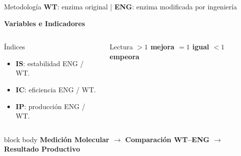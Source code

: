 \begin{frame}[label=metodologia]{Metodología \hfill{\tiny\color{TextoSuave}\textbf{WT}: enzima original \quad | \quad \textbf{ENG}: enzima modificada por ingeniería}}



{\color{Cian}\bfseries Variables e Indicadores}\par
\vspace{0.08cm}

\begin{columns}[T,onlytextwidth]
\end{columns}

\vspace{0.11cm}
\begin{columns}[T,onlytextwidth]
\begin{block}{Índices}
\small
\begin{itemize}
\item \textbf{IS}: estabilidad ENG / WT.
\item \textbf{IC}: eficiencia ENG / WT.
\item \textbf{IP}: producción ENG / WT.
\end{itemize}
\end{block}
\begin{alertblock}{Lectura}
\centering\small\bfseries
$>1$ mejora \qquad $=1$ igual \qquad $<1$ empeora
\end{alertblock}
\end{columns}

\vspace{0.06cm}
\begin{beamercolorbox}[wd=\linewidth,sep=0.08cm,rounded=true,center]{block body}
\small\bfseries\color{CianClaro}
Medición Molecular $\longrightarrow$ Comparación WT--ENG $\longrightarrow$ Resultado Productivo
\end{beamercolorbox}

\vfill
{}
\end{frame}

